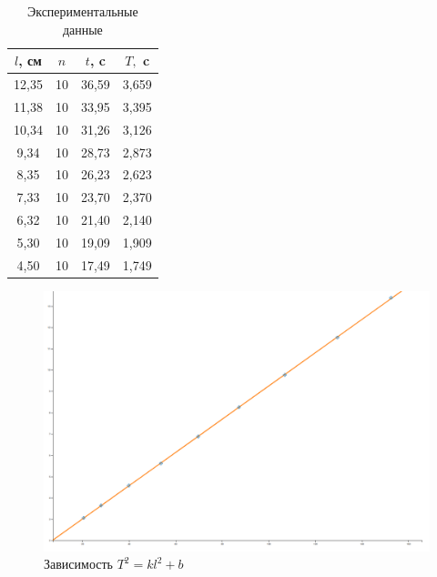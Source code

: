 \documentclass[a4paper, 12pt]{article}
\begin{document}
\begin{table}[h!]
    \begin{center}
        \begin{tabular}{|c|c|c|c|}
        \hline \hline
        $l$, см & $n$ & $t$, c & $T, $ c  \\ \hline \hline
        12,35 & 10 & 36,59 & 3,659 \\ \hline
        11,38 & 10 & 33,95 & 3,395 \\ \hline
        10,34 & 10 & 31,26 & 3,126 \\ \hline
        9,34  & 10 & 28,73 & 2,873 \\ \hline
        8,35  & 10 & 26,23 & 2,623 \\ \hline
        7,33  & 10 & 23,70 & 2,370 \\ \hline
        6,32  & 10 & 21,40 & 2,140 \\ \hline
        5,30  & 10 & 19,09 & 1,909 \\ \hline
        4,50  & 10 & 17,49 & 1,749 \\ \hline \hline
        \end{tabular}
        \caption{Экспериментальные данные}
    \end{center}
\end{table}

\begin{figure}[H]
    \centering
    \includegraphics[scale=0.4, angle=90]{graph2.png}
    \caption{Зависимость $T^2 = kl^2 + b$}
\end{figure}
\end{document}
